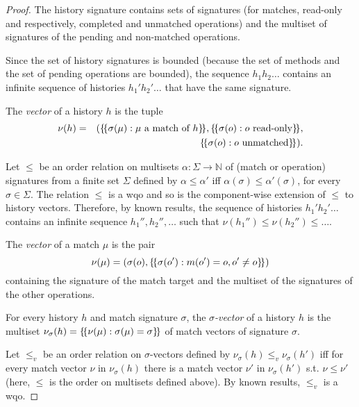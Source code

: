 \begin{proof}
The history signature contains sets of signatures 
(for matches, read-only and respectively, completed and unmatched operations) 
and the multiset of signatures of the pending and non-matched operations.

Since the set of history signatures is bounded (because the set of methods 
and the set of pending operations are bounded),
the sequence $h_1 h_2\ldots $ contains an infinite sequence of histories $h_1' h_2' \ldots$ that have 
the same signature. 

%

The \emph{vector} of a history $h$ is the tuple
\begin{align*}
\nu(h)&=&({\{\!\{ \sigma(\mu): \mu\mbox{ a match of $h$} \}\!\}}, {\{\!\{ \sigma(o): o\mbox{ read-only} \}\!\}}, \\
&& {\{\!\{ \sigma(o): o\mbox{ unmatched} \}\!\}}).
\end{align*}

Let $\leq$ be an order relation on multisets $\alpha:\Sigma\rightarrow\mathbb{N}$ of (match or operation) signatures from a finite set $\Sigma$ 
defined by $\alpha\leq\alpha'$ iff $\alpha(\sigma)\leq\alpha'(\sigma)$, for every $\sigma\in\Sigma$.
The relation $\leq$ is a wqo and so is the component-wise extension of $\leq$ to history vectors.
Therefore, by known results, the sequence of histories $h_1' h_2' \ldots$ contains 
an infinite sequence $h_1'',h_2'',\ldots$ such that $\nu(h_1'')\leq \nu(h_2'')\leq \ldots$.

The \emph{vector} of a match $\mu$ is the pair
\[
\nu(\mu)=(\sigma(o),{\{\!\{ \sigma(o') : m(o')=o, o'\neq o \}\!\}})
\]
containing the signature of the match target and the multiset of the signatures of the other operations.

For every history $h$ and match signature $\sigma$, the \emph{$\sigma$-vector} of a history $h$ is the multiset
$
\nu_\sigma(h)={\{\!\{ \nu(\mu): \sigma(\mu)=\sigma \}\!\}}
$
of match vectors of signature $\sigma$.

Let $\leq_v$ be an order relation on $\sigma$-vectors defined by $\nu_\sigma(h)\leq_v \nu_\sigma(h')$ iff
for every match vector $\nu$ in $\nu_\sigma(h)$ there is a match vector $\nu'$ in $\nu_\sigma(h')$
	s.t. $\nu\leq \nu'$ (here, $\leq$ is the order on multisets defined above).
By known results, $\leq_v$ is a wqo.


\end{proof}
